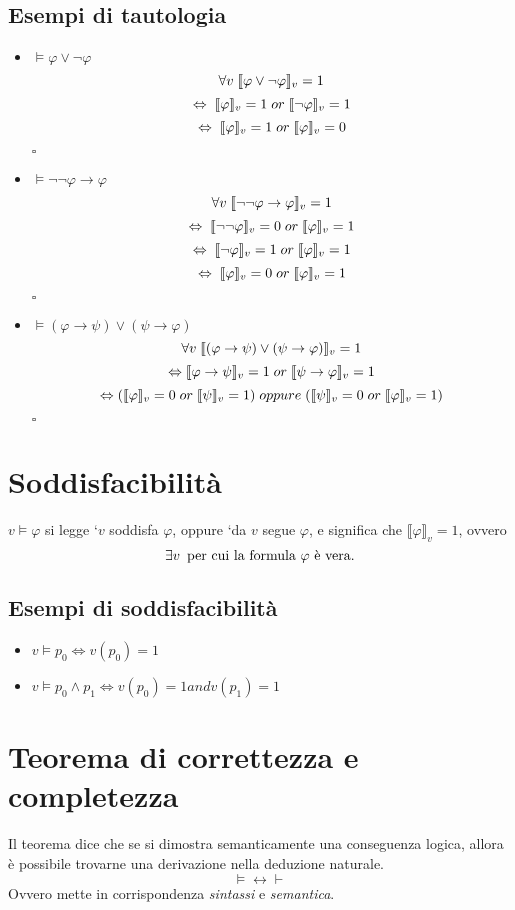 \documentclass[a4paper,12pt]{report}
\newcommand\val[1]{\llbracket#1\rrbracket}
\newcommand\Iff{\Leftrightarrow}
\newcommand\qed{\begin{flushright}{$\square$}\end{flushright}}
\begin{document}
\subsection{Esempi di tautologia}
\begin{itemize}
\item $\vDash \varphi \lor \neg \varphi$
\[ \forall v \thickspace \val{\varphi \lor \neg \varphi}_v = 1 \]
\[ \Leftrightarrow \thickspace \val{\varphi}_v = 1 \thickspace or \thickspace \val{\neg \varphi}_v = 1 \]
\[ \Leftrightarrow \thickspace \val{\varphi}_v = 1 \thickspace or \thickspace \val{\varphi}_v = 0 \] \qed
\item $\vDash \neg\neg \varphi \to \varphi$
\[ \forall v \thickspace \val{\neg\neg \varphi \to \varphi}_v = 1 \]
\[ \Iff \thickspace \val{\neg\neg\varphi}_v = 0 \thickspace or \thickspace \val{\varphi}_v = 1 \]
\[ \Iff \thickspace \val{\neg \varphi}_v = 1 \thickspace or \thickspace \val{\varphi}_v = 1 \]
\[ \Iff \thickspace \val{\varphi}_v = 0 \thickspace or \thickspace \val{\varphi}_v = 1 \] \qed
\item $\vDash (\varphi \to \psi) \lor (\psi \to \varphi)$
\[ \forall v \thickspace \val{(\varphi \to \psi) \lor (\psi \to \varphi)}_v = 1 \]
\[ \Iff \val{\varphi \to \psi}_v = 1 \thickspace or \thickspace \val{\psi \to \varphi}_v = 1 \]
\[ \Iff (\val{\varphi}_v = 0 \thickspace or \thickspace \val{\psi}_v = 1) \thickspace oppure \thickspace (\val{\psi}_v = 0 \thickspace or \thickspace \val{\varphi}_v = 1) \]
\qed
\end{itemize}

\section{Soddisfacibilit\`{a}}
$v \vDash \varphi$ si legge `$v$ soddisfa $\varphi$, oppure `da $v$ segue $\varphi$, e significa che $\val{\varphi}_v = 1 $, ovvero
\[ \exists v \thinspace\text{ per cui la formula $\varphi$ \`{e} vera.} \]
\subsection{Esempi di soddisfacibilit\`{a}}
\begin{itemize}
\item $v \vDash p_0 \Iff v(p_0)=1$
\item $v \vDash p_0 \wedge p_1 \Iff v(p_0) = 1 and v(p_1) = 1$
\end{itemize}

\section{Teorema di correttezza e completezza}
Il teorema dice che se si dimostra semanticamente una conseguenza logica, allora \`{e} possibile trovarne una derivazione nella deduzione naturale.
\[ \vDash \leftrightarrow \vdash \]
Ovvero mette in corrispondenza \emph{sintassi} e \emph{semantica}.
\newpage
\end{document}
